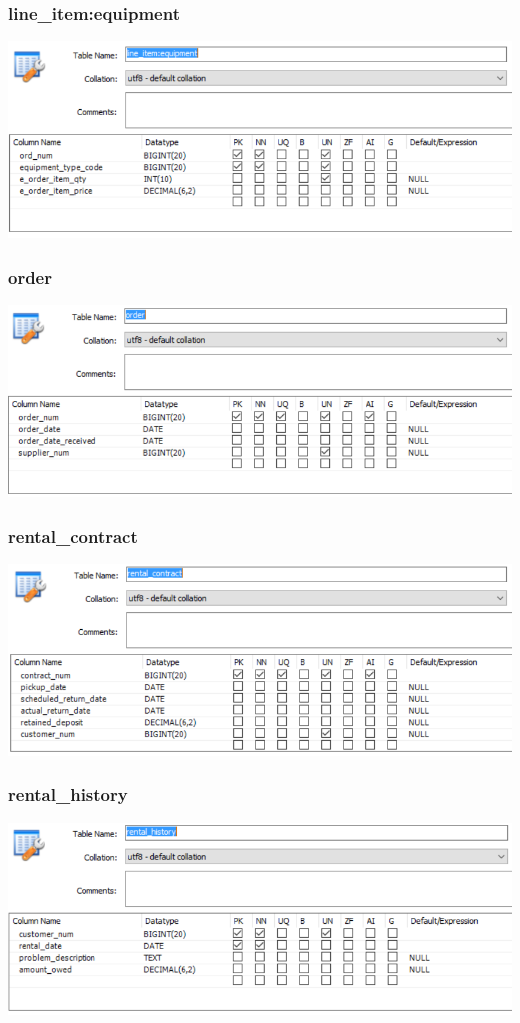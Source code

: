 \documentclass[12pt]{article}
\begin{document}
\subsubsection*{line\_item:equipment} \includegraphics[scale=0.55]{screenshots/structure/line_item_equipment.PNG} \\
\subsubsection*{order} \includegraphics[scale=0.55]{screenshots/structure/order.PNG} \\
\subsubsection*{rental\_contract} \includegraphics[scale=0.55]{screenshots/structure/rental_contract.PNG} \\
\subsubsection*{rental\_history} \includegraphics[scale=0.55]{screenshots/structure/rental_history.PNG} \\
\end{document}
